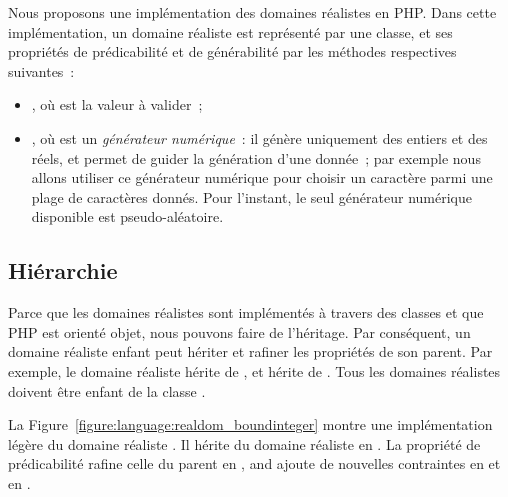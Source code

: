 Nous proposons une implémentation des domaines réalistes en PHP. Dans cette
implémentation, un domaine réaliste est représenté par une classe, et ses
propriétés de prédicabilité et de générabilité par les méthodes respectives
suivantes~:

\begin{itemize}

\item {}, où  est la valeur à valider~;

\item {}, où  est un {\em générateur
numérique}~: il génère uniquement des entiers et des réels, et permet de guider
la génération d'une donnée~; par exemple nous allons utiliser ce générateur
numérique pour choisir un caractère parmi une plage de caractères donnés.  Pour
l'instant, le seul générateur numérique disponible est pseudo-aléatoire.

\end{itemize}

\subsection{Hiérarchie}
\label{subsection:language:realdom:hierarchy}

Parce que les domaines réalistes sont implémentés à travers des classes et que
PHP est orienté objet, nous pouvons faire de l'héritage. Par conséquent, un
domaine réaliste enfant peut hériter et rafiner les propriétés de son parent.
Par exemple, le domaine réaliste  hérite de , et
 hérite de . Tous les domaines réalistes
doivent être enfant de la classe .

La Figure~\ref{figure:language:realdom_boundinteger} montre une implémentation
légère du domaine réaliste . Il hérite du domaine réaliste
 en . La propriété de prédicabilité rafine celle du
parent en , and ajoute de nouvelles contraintes en  et en
.

